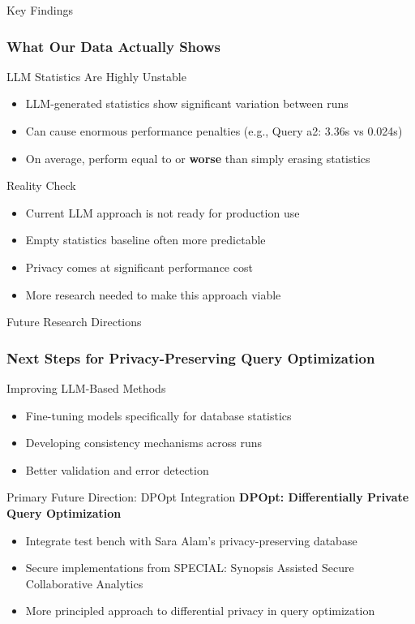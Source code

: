 \documentclass[smaller]{beamer}
\begin{document}
\begin{frame}{Key Findings}
\frametitle{What Our Data Actually Shows}

\begin{alertblock}{\Large LLM Statistics Are Highly Unstable}
\Large
\begin{itemize}
    \item LLM-generated statistics show significant variation between runs
    \item Can cause enormous performance penalties (e.g., Query a2: 3.36s vs 0.024s)
    \item On average, perform equal to or \textbf{worse} than simply erasing statistics
\end{itemize}
\end{alertblock}

\vspace{0.5cm}

\begin{block}{Reality Check}
\begin{itemize}
    \item Current LLM approach is not ready for production use
    \item Empty statistics baseline often more predictable
    \item Privacy comes at significant performance cost
    \item More research needed to make this approach viable
\end{itemize}
\end{block}

\end{frame}

\begin{frame}{Future Research Directions}
\frametitle{Next Steps for Privacy-Preserving Query Optimization}

\begin{block}{Improving LLM-Based Methods}
\begin{itemize}
    \item Fine-tuning models specifically for database statistics
    \item Developing consistency mechanisms across runs
    \item Better validation and error detection
\end{itemize}
\end{block}

\vspace{0.5cm}

\begin{alertblock}{Primary Future Direction: DPOpt Integration}
\Large
\textbf{DPOpt: Differentially Private Query Optimization}
\begin{itemize}
    \item Integrate test bench with Sara Alam's privacy-preserving database
    \item Secure implementations from SPECIAL: Synopsis Assisted Secure Collaborative Analytics
    \item More principled approach to differential privacy in query optimization
\end{itemize}
\end{alertblock}

\end{frame}
\end{document}
